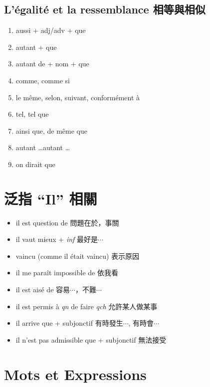 \documentclass{book}
\begin{document}
        \subsection{L'égalité et la ressemblance 相等與相似}
            \begin{enumerate}
                \item aussi + adj/adv + que
                \item autant + que
                \item autant de + nom + que
                \item comme, comme si
                \item le même, selon, suivant, conformément à
                \item tel, tel que
                \item ainsi que, de même que
                \item autant \dots autant \dots
                \item on dirait que
            \end{enumerate}
    
    \section{泛指 ``Il'' 相關}
        \begin{itemize}
            \item il est question de 問題在於，事關
            \item il vaut mieux + \textit{inf} 最好是$\cdots$
            \item vaincu (comme il était vaincu) 表示原因
            \item il me paraît impossible de 依我看
            \item il est aisé de 容易$\cdots$，不難$\cdots$
            \item il est permis à \textit{qn} de faire \textit{qch} 允許某人做某事
            \item il arrive que + subjonctif 有時發生$\cdots$, 有時會$\cdots$
            \item il n'est pas admissible que + subjonctif 無法接受
        \end{itemize}
    
    \section{Mots et Expressions}
\end{document}
